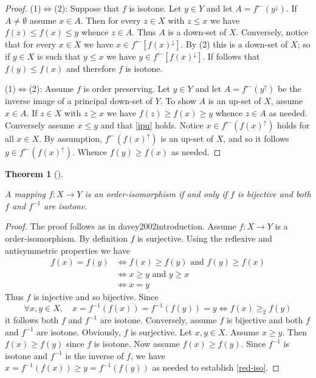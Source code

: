 \documentclass[
  letterpaper,
  10pt,
  reqno,
  twopage,
  openany]{book}
\theoremstyle{plain}
\theoremstyle{definition}
\theoremstyle{definition}
\theoremstyle{definition}
\theoremstyle{plain}
\theoremstyle{plain}
\newtheorem{theorem}{Theorem}[chapter]
\theoremstyle{remark}
\begin{document}
\begin{proof}

(1)\(\Leftrightarrow\)(2): Suppose that \(f\) is isotone. Let \(y\in Y\)
and let \(A=f^{\leftarrow}(y^{\downarrow})\). If \(A\neq\emptyset\)
assume \(x\in A\). Then for every \(z\in X\) with \(z\leq x\) we have
\(f(z)\leq f(x)\leq y\) whence \(z\in A\). Thus \(A\) is a down-set of
\(X\). Conversely, notice that for every \(x\in X\) we have
\(x\in f^{\leftarrow}[f(x)^{\downarrow}]\). By (2) this is a down-set of
\(X\); so if \(y\in X\) is such that \(y\leq x\) we have
\(y\in f^{\leftarrow}[f(x)^{\downarrow}]\). If follows that
\(f(y)\leq f(x)\) and therefore \(f\) is isotone.

(1)\(\Leftrightarrow\)(2): Assume \(f\) is order preserving. Let
\(y\in Y\) and let \(A=f^{\leftarrow}(y^{\uparrow})\) be the inverse
image of a principal down-set of \(Y\). To show \(A\) is an up-set of
\(X\), assume \(x\in A\). If \(z\in X\) with \(z\geq x\) we have
\(f(z)\geq f(x) \geq y\) whence \(z\in A\) as needed. Conversely assume
\(x\leq y\) and that \eqref{ipu} holds. Notice
\(x\in f^{\leftarrow}(f(x)^{\uparrow})\) holds for all \(x\in X\). By
assumption, \(f^{\leftarrow} (f(x)^{\uparrow})\) is an up-set of \(X\),
and so it follows \(y\in f^{\leftarrow}(f(x)^{\uparrow})\). Whence
\(f(y)\geq f(x)\) as needed.

\end{proof}

\leavevmode{}%
\begin{theorem}[]\label{thm-order-isomorphism}

A mapping \(f: X \to Y\) is an order-isomorphism if and only if \(f\) is
bijective and both \(f\) and \(f^{-1}\) are isotone.

\end{theorem}

\begin{proof}

The proof follows as in davey2002introduction. Assume \(f:X\to Y\) is a
order-isomorphism. By definition \(f\) is surjective. Using the
reflexive and antisymmetric properties we have \begin{align*}
f(x)=f(y) & \Longleftrightarrow f(x)\geq f(y)\text{ and } f(y)\geq f(x) \\ 
& \Longleftrightarrow x\geq y \text{ and } y\geq x \\ 
& \Longleftrightarrow x=y
\end{align*} Thus \(f\) is injective and so bijective. Since \[
\forall x,y\in X, \quad x=f^{-1}(f(x))=f^{-1}(f(y))=y \Longleftrightarrow f(x)\geq_2 f(y)
\] it follows both \(f\) and \(f^{-1}\) are isotone. Conversely, assume
\(f\) is bijective and both \(f\) and \(f^{-1}\) are isotone. Obviously,
\(f\) is surjective. Let \(x,y\in X\). Assume \(x\geq y\). Then
\(f(x)\geq f(y)\) since \(f\) is isotone. Now assume \(f(x)\geq f(y)\).
Since \(f^{-1}\) is isotone and \(f^{-1}\) is the inverse of \(f\), we
have \(x=f^{-1}(f(x))\geq y=f^{-1}(f(y))\) as needed to establish
\eqref{red-iso}.

\end{proof}
\end{document}
